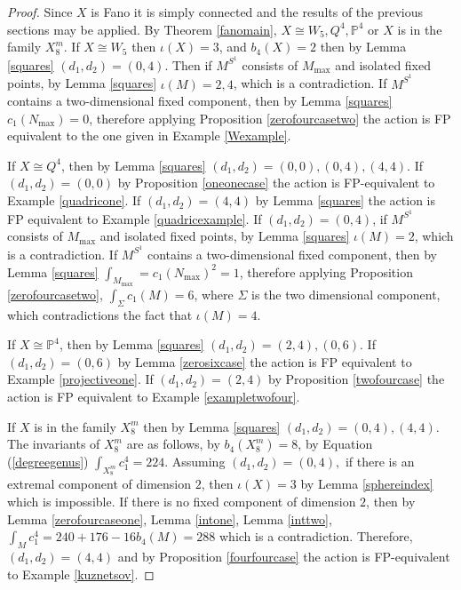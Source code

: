 \documentclass[12pt]{article}
\begin{document}
\begin{proof} Since $X$ is Fano it is simply connected and the results of the previous sections may be applied. By Theorem \ref{fanomain}, $X \cong W_5,Q^4,\mathbb{P}^4$ or $X$ is in the family $ X^m_{8}$. If $X \cong W_5$ then $\iota(X)=3$, and $b_{4}(X) =2$ then by Lemma \ref{squares} $(d_1,d_2) = (0,4)$. Then if $M^{S^1}$ consists of $M_{\max}$ and isolated fixed points, by Lemma \ref{squares} $\iota(M)=2,4$, which is a contradiction. If $M^{S^1}$ contains a two-dimensional fixed component, then by Lemma \ref{squares} $c_{1}(N_{\max})=0$, therefore applying Proposition \ref{zerofourcasetwo} the action is FP equivalent to the one given in Example \ref{Wexample}.

If $X \cong Q^4$, then by Lemma \ref{squares} $(d_{1},d_2) = (0,0),(0,4),(4,4)$. If $(d_1,d_2)=(0,0)$ by Proposition \ref{oneonecase} the action is FP-equivalent to Example \ref{quadricone}. If $(d_1,d_2) = (4,4)$ by Lemma \ref{squares} the action is FP equivalent to   Example \ref{quadricexample}. If $(d_1,d_{2}) = (0,4)$, if $M^{S^1}$ consists of $M_{\max}$ and isolated fixed points, by Lemma \ref{squares} $\iota(M)=2$, which is a contradiction. If $M^{S^1}$ contains a two-dimensional fixed component, then by Lemma \ref{squares} $\int_{M_{\max}} = c_{1}(N_{\max})^2=1$, therefore applying Proposition \ref{zerofourcasetwo}, $\int_{\Sigma}c_{1}(M)=6$, where $\Sigma$ is the two dimensional component, which contradictions the fact that $\iota(M)=4$.

If $X \cong \mathbb{P}^4$,  then by Lemma \ref{squares} $(d_{1},d_2) = (2,4),(0,6)$.  If $(d_1,d_2) = (0,6)$ by Lemma \ref{zerosixcase} the action is FP equivalent to   Example \ref{projectiveone}. If $(d_1,d_2) = (2,4)$ by Proposition \ref{twofourcase} the action is FP equivalent to   Example \ref{exampletwofour}.

If $X $ is in the family $X^m_{8}$ then by Lemma \ref{squares} $(d_1,d_2) = (0,4),(4,4).$ The invariants of  $X^m_{8}$ are as follows, by  \cite[Lemma 4.4]{PZ1}   $b_{4}(X^{m}_{8}) = 8$, by Equation (\ref{degreegenus}) $\int_{X^{m}_{8}} c_1^4 = 224$.  Assuming $(d_1,d_2) = (0,4),$ if there is an extremal component of dimension $2$, then $\iota(X)=3$ by Lemma \ref{sphereindex} which is impossible. If there is no fixed component of dimension $2$, then by Lemma \ref{zerofourcaseone}, Lemma \ref{intone}, Lemma \ref{inttwo},  $\int_{M} c_{1}^4 = 240 + 176  - 16 b_{4}(M) = 288$ which is a contradiction. Therefore, $(d_1,d_2) = (4,4)$ and by Proposition \ref{fourfourcase} the action is FP-equivalent to Example \ref{kuznetsov}.
\end{proof}
\end{document}
